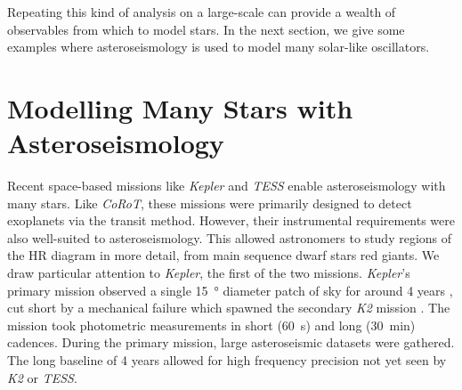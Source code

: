 

Repeating this kind of analysis on a large-scale can provide a wealth of observables from which to model stars. In the next section, we give some examples where asteroseismology is used to model many solar-like oscillators.

\section[Modelling Stars with Asteroseismology]{Modelling Many Stars with Asteroseismology}\label{sec:many-stars}

Recent space-based missions like \emph{Kepler} and \emph{TESS} enable asteroseismology with many stars. Like \emph{CoRoT}, these missions were primarily designed to detect exoplanets via the transit method. However, their instrumental requirements were also well-suited to asteroseismology. This allowed astronomers to study regions of the HR diagram in more detail, from main sequence dwarf stars red giants. We draw particular attention to \emph{Kepler}, the first of the two missions. \emph{Kepler}'s primary mission observed a single \SI{15}{\degree} diameter patch of sky for around 4 years \citep{Borucki.Koch.ea2010}, cut short by a mechanical failure which spawned the secondary \emph{K2} mission \citep{Howell.Sobeck.ea2014}. The mission took photometric measurements in short (\SI{60}{\second}) and long (\SI{30}{\minute}) cadences. During the primary mission, large asteroseismic datasets were gathered. The long baseline of 4 years allowed for high frequency precision not yet seen by \emph{K2} or \emph{TESS}.

